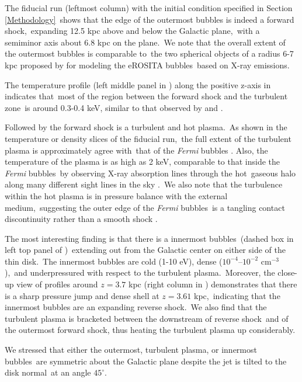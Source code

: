 \documentclass[twocolumn]{aastex631}
\begin{document}
 The fiducial run (leftmost column) with the initial condition specified in Section \ref{Methodology}\
 shows that the edge of the outermost bubbles is indeed a forward shock,\
 expanding 12.5 kpc above and below the Galactic plane,\
 with a semiminor axis about 6.8 kpc on the plane.\
 We note that the overall extent of the outermost bubbles is comparable to\
 the two spherical objects of a radius 6-7 kpc proposed by \citet{Predehl2020} for modeling the eROSITA bubbles\
 based on X-ray emissions.

 The temperature profile (left middle panel in ) along the positive z-axis in\
  indicates that\
 most of the region between the forward shock and the turbulent zone\
 is around 0.3-0.4 keV, similar to that observed by \citet{Miller2016} and \citet{Kataoka2018}.

 Followed by the forward shock is a turbulent and hot plasma.\
 As shown in the temperature or density slices of the fiducial run,\
 the full extent of the turbulent plasma is approximately agree with\
 that of the \textit{Fermi} bubbles \citep{Su2010}.
 Also, the temperature of the plasma is as high as 2 keV, comparable to that inside the \textit{Fermi} bubbles\
 by observing X-ray absorption lines through the hot\
 gaseous halo along many different sight lines in the sky \citep{Miller_2013}.\
 We also note that the turbulence within the hot plasma is in pressure balance with the external medium,\
 suggesting the outer edge of the \textit{Fermi} bubbles\
 is a tangling contact discontinuity rather than a smooth shock \citep{Zhang2020}.

 The most interesting finding is that there is a innermost bubbles\
 (dashed box in left top panel of )\
 extending out from the Galactic center on either side of the thin disk.\
 The innermost bubbles are cold (1-10 eV), dense ($10^{-4}$--$10^{-2}$ cm$^{-3}$),\
 and underpressured with respect to the turbulent plasma.\
 Moreover, the close-up view of profiles around $z=3.7$ kpc (right column in )
 demonstrates that there is a sharp pressure jump and dense shell at $z=3.61$ kpc,\
 indicating that the innermost bubbles are an expanding reverse shock.\
 We also find that the turbulent plasma is bracketed between the downstream of reverse shock\
 and of the outermost forward shock, thus heating the turbulent plasma up considerably.

 We stressed that either the outermost, turbulent plasma, or innermost bubbles\
 are symmetric about the Galactic plane despite the jet is tilted to the disk normal\
 at an angle $45^{\circ}$.
\end{document}
